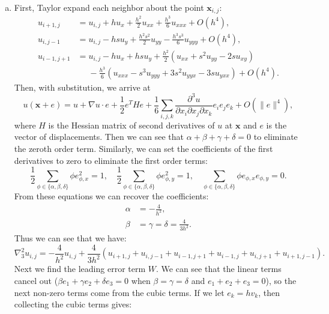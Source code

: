 \documentclass{article}
\renewcommand{\vec}[1]{\mathbf{#1}}
\newcommand{\vx}{\vec{x}}
\begin{document}
\begin{enumerate}[(a)]
  \item First, Taylor expand each neighbor about the point $\vx_{i,j}$:
  \begin{align*}
    u_{i+1,j} & = u_{i,j} + h u_x + \frac{h^2}{2} u_{xx} + \frac{h^3}{6} u_{xxx} + O(h^4), \\
    u_{i,j-1} & = u_{i,j} - hs u_y + \frac{h^2 s^2}{2} u_{yy} - \frac{h^3 s^3}{6} u_{yyy} + O(h^4), \\
    u_{i-1,j+1} & = u_{i,j} - h u_x + hs u_y + \frac{h^2}{2}(u_{xx} + s^2 u_{yy} - 2s u_{xy}) \\
               & \phantom{=} - \frac{h^3}{6}(u_{xxx} - s^3 u_{yyy} + 3s^2 u_{yyx} - 3s u_{yxx}) + O(h^4).
  \end{align*}
  Then, with substitution, we arrive at 
  \begin{equation*}
    u(\vx + e) = u + \nabla u \cdot e + \frac{1}{2} e^T H e + \frac{1}{6} \sum_{i,j,k} \frac{\partial^3 u}{\partial x_i \partial x_j \partial x_k} e_i e_j e_k + O(\|e\|^4),
  \end{equation*}
  where $H$ is the Hessian matrix of second derivatives of $u$ at $\vx$ and $e$ is the vector of displacements. Then we can see that $\alpha  + \beta  + \gamma + \delta = 0$ to eliminate the zeroth order term. Similarly, we can set the coefficients of the first derivatives to zero to eliminate the first order terms:
  \begin{equation*}
    \frac{1}{2}\sum_{\phi \in \{\alpha,\beta,\delta\}} \phi e^2_{\phi,x} = 1, \quad \frac{1}{2}\sum_{\phi \in \{\alpha,\beta,\delta\}} \phi e^2_{\phi,y} = 1, \quad \sum_{\phi \in \{\alpha,\beta,\delta\}} \phi e_{\phi,x} e_{\phi,y} = 0.
  \end{equation*}
  From these equations we can recover the coefficients:
  \begin{align*}
    \alpha & = -\frac{4}{h^2}, \\
    \beta & = \gamma = \delta = \frac{4}{3h^2}.
  \end{align*}
  Thus we can see that we have:
  \begin{equation*}
    \nabla^2_3 u_{i,j} = -\frac{4}{h^2} u_{i,j} + \frac{4}{3h^2} (u_{i+1,j} + u_{i,j-1} + u_{i-1,j+1} + u_{i-1,j} + u_{i,j+1} + u_{i+1,j-1}).
  \end{equation*}
  Next we find the leading error term $W$. We can see that the linear terms cancel out ($\beta e_1 + \gamma e_2 + \delta e_3 = 0$ when $\beta = \gamma = \delta$ and $e_1 + e_2 + e_3 = 0$), so the next non-zero terms come from the cubic terms. If we let $e_k = h v_k$, then collecting the cubic terms gives:

\end{enumerate}
\end{document}
